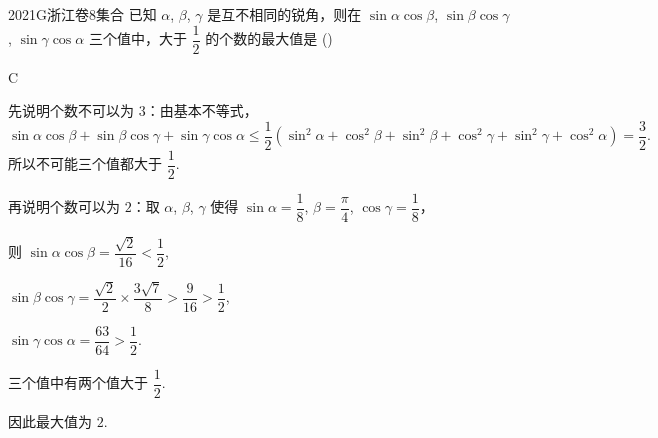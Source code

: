 
\begin{problem}{2021}{G}{浙江卷}{8}{集合}
已知 $ \alpha $, $ \beta $, $ \gamma $ 是互不相同的锐角，则在 $ \sin\alpha\cos\beta $, $ \sin\beta\cos\gamma $, $ \sin\gamma\cos\alpha $ 三个值中，大于 $ \dfrac{1}{2} $ 的个数的最大值是 (\hspace{1cm})
\begin{choices}
\end{choices}
\end{problem}

\begin{answer}
C
\end{answer}

\begin{solutions}
 先说明个数不可以为 $3$：由基本不等式，
$$
\sin\alpha\cos\beta + \sin\beta\cos\gamma + \sin\gamma\cos\alpha
\leq \dfrac{1}{2}(\sin^2\alpha + \cos^2\beta + \sin^2\beta + \cos^2\gamma + \sin^2\gamma + \cos^2\alpha)
= \dfrac{3}{2}.
$$
所以不可能三个值都大于 $ \dfrac{1}{2} $.

 再说明个数可以为 $2$：取 $ \alpha $, $ \beta $, $ \gamma $ 使得 $ \sin\alpha = \dfrac{1}{8} $, $ \beta = \dfrac{\pi}{4} $, $ \cos\gamma = \dfrac{1}{8} $，

则
$\sin\alpha\cos\beta = \dfrac{\sqrt{2}}{16} < \dfrac{1}{2}$,

$\sin\beta\cos\gamma = \dfrac{\sqrt{2}}{2} \times \dfrac{3\sqrt 7}{8} > \dfrac{9}{16} > \dfrac{1}{2}$,

$\sin\gamma\cos\alpha = \dfrac{63}{64} > \dfrac{1}{2}$.

三个值中有两个值大于 $ \dfrac{1}{2} $.

因此最大值为 $2$.
\end{solutions}